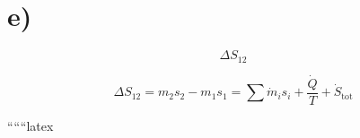 

\section*{e)}

\[
\Delta S_{12}
\]

\[
\Delta S_{12} = m_2 s_2 - m_1 s_1 = \sum \dot{m}_i s_i + \frac{\dot{Q}}{T} + \dot{S}_{\text{tot}}
\]

``````latex